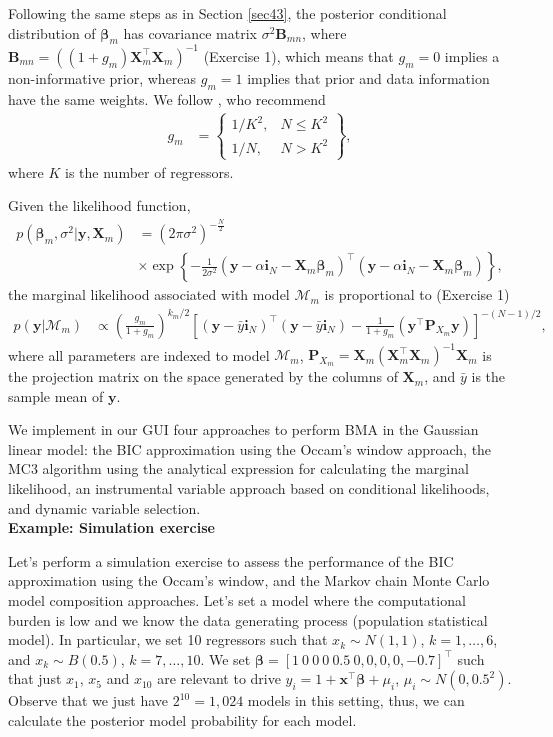 Following the same steps as in Section \ref{sec43}, the posterior conditional distribution of $\bm{\beta}_m$ has covariance matrix $\sigma^2\bm{B}_{mn}$, where $\bm{B}_{mn}=((1+g_m)\bm{X}_m^{\top}\bm{X}_m)^{-1}$ (Exercise 1), which means that $g_m=0$ implies a non-informative prior, whereas $g_m=1$ implies that prior and data information have the same weights. We follow \cite{fernandez2001benchmark}, who recommend
\begin{align*}
	g_m & =
	\begin{Bmatrix}
		1/K^2, & N \leq K^2\\
		1/N, & N>K^2 
	\end{Bmatrix},
\end{align*} 
where $K$ is the number of regressors.
 
Given the likelihood function, 
\begin{align*}
	p(\bm{\beta}_m, \sigma^2|\bm{y}, \bm{X}_m) &= (2\pi\sigma^2)^{-\frac{N}{2}}\\
	&\times \exp \left\{-\frac{1}{2\sigma^2} (\bm{y} - \alpha\bm{i}_N - \bm{X}_m\bm{\beta}_m)^{\top}(\bm{y} - \alpha\bm{i}_N - \bm{X}_m\bm{\beta}_m) \right\},
\end{align*}
the marginal likelihood associated with model $\mathcal{M}_m$ is proportional to (Exercise 1) 
\begin{align*}
	p(\bm{y}|\mathcal{M}_m)&\propto \left(\frac{g_m}{1+g_m}\right)^{k_m/2} \left[(\bm{y}-\bar{y}\bm{i}_N)^{\top}(\bm{y}-\bar{y}\bm{i}_N)-\frac{1}{1+g_m}(\bm{y}^{\top}\bm{P}_{X_m}\bm{y})\right]^{-(N-1)/2},
\end{align*}
where all parameters are indexed to model $\mathcal{M}_m$, $\bm{P}_{X_m}=\bm{X}_m(\bm{X}_m^{\top}\bm{X}_m)^{-1}\bm{X}_m$ is the projection matrix on the space generated by the columns of $\bm{X}_m$, and $\bar{y}$ is the sample mean of $\bm{y}$.

We implement in our GUI four approaches to perform BMA in the Gaussian linear model: the BIC approximation using the Occam's window approach, the MC3 algorithm using the analytical expression for calculating the marginal likelihood, an instrumental variable approach based on conditional likelihoods, and dynamic variable selection.\\

\textbf{Example: Simulation exercise}

Let's perform a simulation exercise to assess the performance of the BIC approximation using the Occam's window, and the Markov chain Monte Carlo model composition approaches. Let's set a model where the computational burden is low and we know the data generating process (population statistical model). In particular, we set 10 regressors such that $x_k\sim N(1, 1)$, $k =1,\dots,6$, and $x_k\sim B(0.5)$, $k=7,\dots,10$. We set $\bm{\beta}=[1 \ 0 \ 0 \ 0 \ 0.5 \ 0, 0, 0, 0, -0.7]^{\top}$ such that just $x_1$, $x_5$ and $x_{10}$ are relevant to drive $y_i=1+\bm{x}^{\top}\bm{\beta}+\mu_i$, $\mu_i\sim N(0,0.5^2)$. Observe that we just have $2^{10}=1,024$ models in this setting, thus, we can calculate the posterior model probability for each model. 

